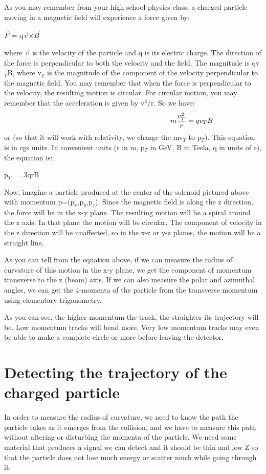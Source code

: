 As you may remember from your high school physics class, a charged particle moving in a magnetic field will experience a force given by:
\begin{center}$\vec{F}$ = q$\vec{v}$$\times$$\vec{B}$ \end{center}
 where $\vec{v}$ is the velocity of the particle and q is its electric charge. The direction of the force is perpendicular to both the velocity and the field. The magnitude is qv$_{T}$B, where v$_{T}$ is the magnitude of the component of the velocity perpendicular to the magnetic field. You may remember that when the force is perpendicular to the velocity, the resulting motion is circular.  For circular motion, you may remember that the acceleration is given by v$^{2}$/r. So we have:
\begin {equation} \hspace {58 mm}
m\dfrac{v_{T}^{2}}{r} = qv_{T}B
\end{equation}
or (so that it will work with relativity, we change the mv$_{T}$ to p$_{T}$). This equation is in cgs units. In convenient units (r in m, p$_{T}$ in GeV, B in Tesla, q in units of e), the equation is:
\begin{center} p$_{T}$ = .3qrB \end{center}
Now, imagine a particle produced at the center of the solenoid pictured above with momentum p=(p$_{x}$,p$_{y}$,p$_{z}$). Since the magnetic field is along the z direction, the force will be in the x-y plane. The resulting motion will be a spiral around the z axis. In that plane the motion will be circular.  The component of velocity in the z direction will be unaffected, so in the x-z or y-z planes, the motion will be a straight line.

As you can tell from the equation above, if we can measure the radius of curvature of this motion in the x-y plane, we get the component of momentum transverse to the z (beam) axis.  If we can also measure the polar and azimuthal angles, we can get the 4-momenta of the particle from the transverse momentum using elementary trigonometry.

As you can see, the higher momentum the track, the straighter its trajectory will be.  Low momentum tracks will bend more.  Very low momentum tracks may even be able to make a complete circle or more before leaving the detector. 

\section{Detecting the trajectory of the charged particle}
In order to measure the radius of curvature, we need to know the path the particle takes as it emerges from the collision, and we have to measure this path without altering or disturbing the momenta of the particle.  We need some material that produces a signal we can detect and it should be thin and low Z so that the particle does not lose much energy or scatter much while going through it. 
 
